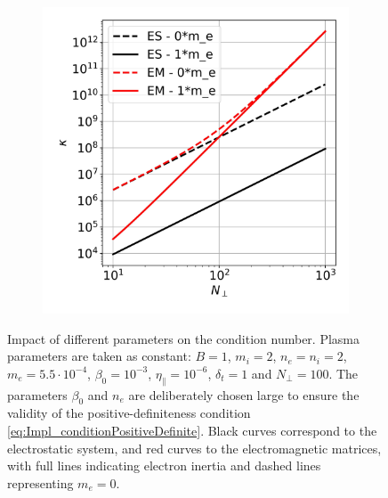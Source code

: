 \begin{figure}[H]
\begin{subfigure}[t]{0.30\textwidth}
		\label{fig:Impl_conditionNumber_dt}
	\end{subfigure}
	\begin{subfigure}[t]{0.30\textwidth}
		\centering
		\includegraphics[width=1\textwidth]{schemes/conditionNumber_Nperp.jpg}
		\label{fig:Impl_conditionNumber_Nperp}
	\end{subfigure}
	\caption{Impact of different parameters on the condition number. Plasma parameters are taken as constant: $B=1$, $m_i = 2$, $n_e = n_i = 2$, $m_e = 5.5\cdot 10^{-4}$, $\beta_0 = 10^{-3}$, $\eta_\parallel = 10^{-6}$, $\delta_t = 1$ and $N_\perp = 100$. The parameters $\beta_0$ and $n_e$ are deliberately chosen large to ensure the validity of the positive-definiteness condition \ref{eq:Impl_conditionPositiveDefinite}. Black curves correspond to the electrostatic system, and red curves to the electromagnetic matrices, with full lines indicating electron inertia and dashed lines representing $m_e = 0$.}
	\label{fig:Impl_conditionNumber}
\end{figure}


